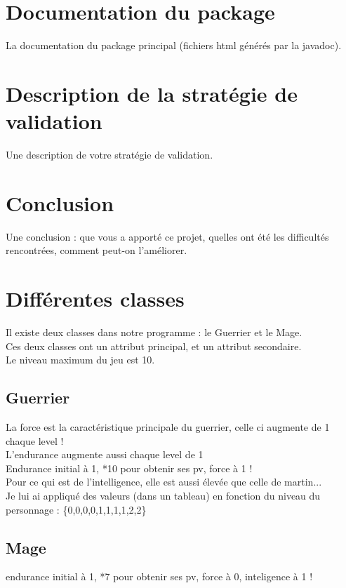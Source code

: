 \documentclass[a4paper,titlepage]{article}
\begin{document}
	\section{Documentation du package}
	La documentation du package principal (fichiers html générés par la javadoc).
	\clearpage
	
	\section{Description de la stratégie de validation}
	Une description de votre stratégie de validation.
	\clearpage
	
	\section{Conclusion}
	Une conclusion : que vous a apporté ce projet, quelles ont été les difficultés rencontrées, comment peut-on l’améliorer.
	\clearpage
	
	
	\section{Différentes classes}
		Il existe deux classes dans notre programme : le Guerrier et le Mage.\\
		Ces deux classes ont un attribut principal, et un attribut secondaire.\\
		Le niveau maximum du jeu est 10.
		
	\subsection{Guerrier}
		La force est la caractéristique principale du guerrier, celle ci augmente de 1 chaque level !\\
		L'endurance augmente aussi chaque level de 1\\
		Endurance initial à 1, *10 pour obtenir ses pv, force à 1 !\\
		Pour ce qui est de l'intelligence, elle est aussi élevée que celle de martin...\\ Je lui ai appliqué des valeurs (dans un tableau) en fonction du niveau du personnage : 	\{0,0,0,0,1,1,1,1,2,2\}
		
	\subsection{Mage}
		endurance initial à 1, *7 pour obtenir ses pv, force à 0, inteligence à 1 !
	
\end{document}
